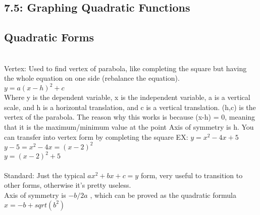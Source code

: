 \documentclass[12pt]{article}
\begin{document}
\begin{center}
    \section* {7.5: Graphing Quadratic Functions}
    \subsection* {Quadratic Forms} 
    ~\\
    \quad\quad Vertex: Used to find vertex of parabola, like completing the square but having the whole equation on one side (rebalance the equation).\\
    $y = a(x-h)^2 + c$ \\
    Where y is the dependent variable, x is the independent variable, a is a vertical scale, and h is a horizontal translation, and c is a vertical translation.
    (h,c) is the vertex of the parabola.
    The reason why this works is because (x-h) = 0, meaning that it is the maximum/minimum value at the point
    Axis of symmetry is h.
    You can transfer into vertex form by completing the square
    EX: $ y= x^2 - 4x +5$ \\
   $ y - 5 = x^2 - 4x = (x-2)^2$ \\
    $y=(x-2)^2 + 5$ \\~\\
    \qquad Standard: Just the typical \boldmath $ax^2+bx+c = y$ form, very useful to transition to other forms, otherwise it's pretty useless.\\
    Axis of symmetry is $-b/2a$ , which can be proved as the quadratic formula $x = -b+sqrt(b^2)$

\end{center}
\end{document}
